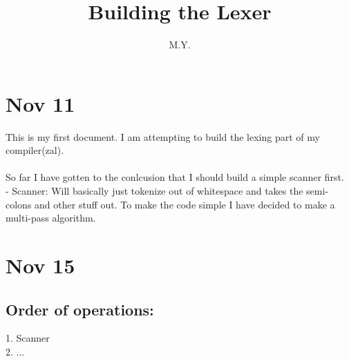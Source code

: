 \documentclass{article}
\begin{document}
\title{Building the Lexer}
\author{M.Y.}

\maketitle

\section*{Nov 11}

This is my first document. I am attempting to build  the
lexing part of my compiler(zal).
\\\\
So far I have gotten to the conlcusion that I should
build a simple scanner first.
\\
- Scanner: Will basically just tokenize out of whitespace
    and takes the semi-colons and other stuff out. To make the
    code simple I have decided to make a multi-pass algorithm.

\section*{Nov 15}
\subsection*{Order of operations:}
1. Scanner \\
2. ...
\end{document}
